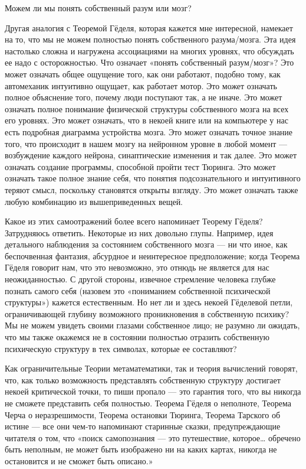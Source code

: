 Можем ли мы понять собственный разум или мозг?

Другая аналогия с Теоремой Гёделя, которая кажется мне интересной, намекает на то, что мы не можем полностью понять собственного разума/мозга. Эта идея настолько сложна и нагружена ассоциациями на многих уровнях, что обсуждать ее надо с осторожностью. Что означает «понять собственный разум/мозг»? Это может означать общее ощущение того, как они работают, подобно тому, как автомеханик интуитивно ощущает, как работает мотор. Это может означать полное объяснение того, почему люди поступают так, а не иначе. Это может означать полное понимание физической структуры собственного мозга на всех его уровнях. Это может означать, что в некоей книге или на компьютере у нас есть подробная диаграмма устройства мозга. Это может означать точное знание того, что происходит в нашем мозгу на нейронном уровне в любой момент --- возбуждение каждого нейрона, синаптические изменения и так далее. Это может означать создание программы, способной пройти тест Тюринга. Это может означать такое полное знание себя, что понятия подсознательного и интуитивного теряют смысл, поскольку становятся открыты взгляду. Это может означать также любую комбинацию из вышеприведенных вещей.

Какое из этих самоотражений более всего напоминает Теорему Гёделя? Затрудняюсь ответить. Некоторые из них довольно глупы. Например, идея детального наблюдения за состоянием собственного мозга --- ни что иное, как беспочвенная фантазия, абсурдное и неинтересное предположение; когда Теорема Гёделя говорит нам, что это невозможно, это отнюдь не является для нас неожиданностью. С другой стороны, извечное стремление человека глубже познать самого себя (назовем это «пониманием собственной психической структуры») кажется естественным. Но нет ли и здесь некоей Гёделевой петли, ограничивающей глубину возможного проникновения в собственную психику? Мы не можем увидеть своими глазами собственное лицо; не разумно ли ожидать, что мы также окажемся не в состоянии полностью отразить собственную психическую структуру в тех символах, которые ее составляют?

Как ограничительные Теории метаматематики, так и теория вычислений говорят, что, как только возможность представлять собственную структуру достигает некоей критической точки, то пиши пропало --- это гарантия того, что вы никогда не сможете представить себя полностью. Теорема Гёделя о неполноте, Теорема Черча о неразрешимости, Теорема остановки Тюринга, Теорема Тарского об истине --- все они чем-то напоминают старинные сказки, предупреждающие читателя о том, что «поиск самопознания --- это путешествие, которое\ldots{} обречено быть неполным, не может быть изображено ни на каких картах, никогда не остановится и не сможет быть описано.»

